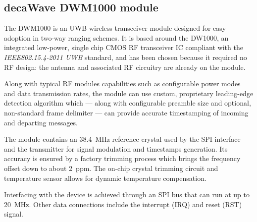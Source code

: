 \subsection{decaWave DWM1000 module}

The DWM1000 is an UWB wireless transceiver module designed for easy adoption in two-way ranging schemes.
It is based around the DW1000, an integrated low-power, single chip CMOS RF transceiver IC compliant with the \emph{IEEE802.15.4-2011 UWB} standard, and has been chosen because it required no RF design: the antenna and associated RF circuitry are already on the module.

Along with typical RF modules capabilities such as configurable power modes and data transmission rates, the module can use custom, proprietary leading-edge detection algorithm which --- along with configurable preamble size and optional, non-standard frame delimiter --- can provide accurate timestamping of incoming and departing messages.

The module contains an \SI{38.4}{\mega\hertz} reference crystal used by the SPI interface and the transmitter for signal modulation and timestamps generation.
Its accuracy is ensured by a factory trimming process which brings the frequency offset down to about \SI{2}{ppm}.
The on-chip crystal trimming circuit and temperature sensor allows for dynamic temperature compensation.

Interfacing with the device is achieved through an SPI bus that can run at up to \SI{20}{\mega\hertz}.
Other data connections include the interrupt (IRQ) and reset (RST) signal. 
